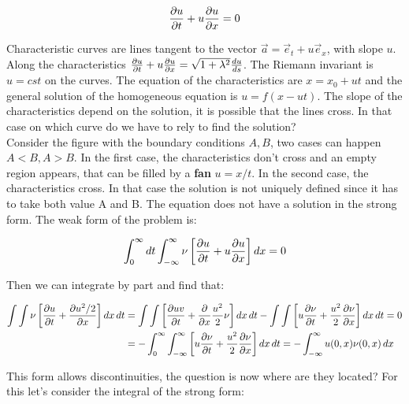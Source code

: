 \begin{equation}
\frac{\partial u}{\partial t} + u \frac{\partial u}{\partial x} = 0
\end{equation}

Characteristic curves are lines tangent to the vector $\vec{a} = \vec{e}_t + u \vec{e}_x$, with slope $u$. Along the characteristics $\frac{\partial u }{\partial t} + u \frac{\partial u }{\partial x} = \sqrt{1+\lambda ^2} \frac{d u}{ds}$. The Riemann invariant is $u = cst$ on the curves. The equation of the characteristics are $x = x_0 + u t$ and the general solution of the homogeneous equation is $u = f(x-ut)$. The slope of the characteristics depend on the solution, it is possible that the lines cross. In that case on which curve do we have to rely to find the solution? \\

Consider the figure with the boundary conditions $A,B$, two cases can happen $A<B, A>B$. In the first case, the characteristics don't cross and an empty region appears, that can be filled by a \textbf{fan} $u = x/t$. In the second case, the characteristics cross. In that case the solution is not uniquely defined since it has to take both value A and B. The equation does not have a solution in the strong form. The weak form of the problem is:  

\begin{equation}
\int _0 ^\infty dt \int _{-\infty}^\infty \nu \left[\frac{\partial u}{\partial t} + u \frac{\partial u }{\partial x}\right] dx = 0 
\end{equation}

Then we can integrate by part and find that: 

\begin{equation}
\begin{aligned}
\int \int \nu \left[ \frac{\partial u}{\partial t} +\frac{\partial u^2/2}{\partial x}\right] dx\, dt &= \int \int \left[ \frac{\partial uv}{\partial t} + \frac{\partial}{\partial x} \frac{u^2}{2} \nu  \right]dx\, dt - \int \int \left[ u\frac{\partial \nu}{\partial t} + \frac{u^2}{2}\frac{\partial \nu }{\partial x}\right]dx\, dt  =0 \\
&=-\int _0^\infty  \int _{-\infty}^\infty \left[u \frac{\partial \nu}{\partial t} + \frac{u^2}{2}\frac{\partial \nu }{\partial x}\right] dx\, dt = -\int _{-\infty}^\infty u(0,x)\nu (0,x) \, dx
\end{aligned}
\end{equation}

This form allows discontinuities, the question is now where are they located? For this let's consider the integral of the strong form: 

